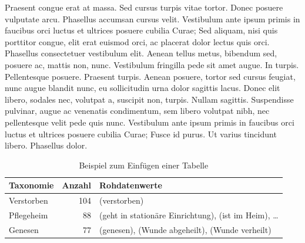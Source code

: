 Praesent congue erat at massa. Sed cursus turpis vitae tortor. Donec posuere vulputate arcu. Phasellus accumsan cursus velit. Vestibulum ante ipsum primis in faucibus orci luctus et ultrices posuere cubilia Curae; Sed aliquam, nisi quis porttitor congue, elit erat euismod orci, ac placerat dolor lectus quis orci. Phasellus consectetuer vestibulum elit. Aenean tellus metus, bibendum sed, posuere ac, mattis non, nunc. Vestibulum fringilla pede sit amet augue. In turpis. Pellentesque posuere. Praesent turpis. Aenean posuere, tortor sed cursus feugiat, nunc augue blandit nunc, eu sollicitudin urna dolor sagittis lacus. Donec elit libero, sodales nec, volutpat a, suscipit non, turpis. Nullam sagittis. Suspendisse pulvinar, augue ac venenatis condimentum, sem libero volutpat nibh, nec pellentesque velit pede quis nunc. Vestibulum ante ipsum primis in faucibus orci luctus et ultrices posuere cubilia Curae; Fusce id purus. Ut varius tincidunt libero. Phasellus dolor. 
 
\begin{table}[htbp]
	\centering
	\caption{Beispiel zum Einfügen einer Tabelle}
	\label{tab:Betreuungsende}
	\begin{tabular}{lrl}
		\toprule
		\textbf{Taxonomie} & \textbf{Anzahl} & \textbf{Rohdatenwerte} \\
		\midrule
		Verstorben & 104 & (verstorben) \\
		Pflegeheim & 88  & (geht in stationäre Einrichtung), (ist im Heim), \dots \\
		Genesen    & 77  & (genesen), (Wunde abgeheilt), (Wunde verheilt) \\
		\bottomrule
	\end{tabular}
\end{table}

